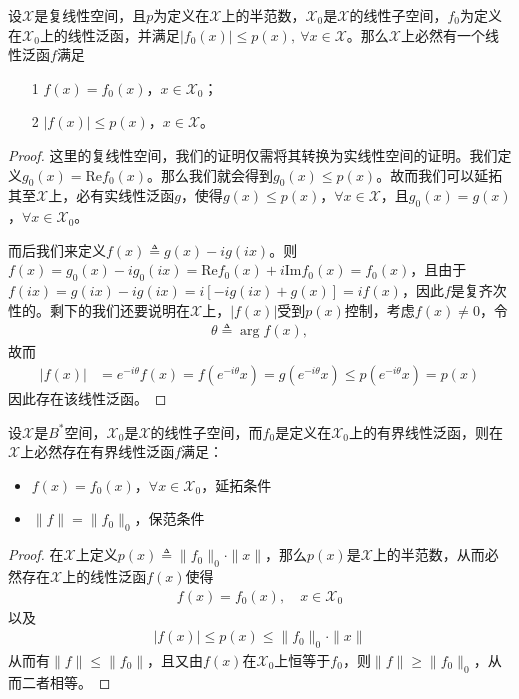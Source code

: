 \begin{theorem}
    设$\mathscr{X}$是复线性空间，且$p$为定义在$\mathscr{X}$上的半范数，$\mathscr{X}_0$是$\mathscr{X}$的线性子空间，$f_0$为定义在$\mathscr{X}_0$上的线性泛函，并满足$|f_0(x)| \leqslant p(x),\ \forall x\in\mathscr{X}$。那么$\mathscr{X}$上必然有一个线性泛函$f$满足
    \begin{itemize}
        \item[1] $f(x) = f_0(x)$，$x\in\mathscr{X}_0$；
        \item[2] $|f(x)| \leqslant p(x)$，$x\in\mathscr{X}$。
    \end{itemize}
\end{theorem}
\begin{proof}
    这里的复线性空间，我们的证明仅需将其转换为实线性空间的证明。我们定义$g_0(x) = \text{Re} f_0(x)$。那么我们就会得到$g_0(x)\leqslant p(x)$。故而我们可以延拓其至$\mathscr{X}$上，必有实线性泛函$g$，使得$g(x)\leqslant p(x)$，$\forall x\in\mathscr{X}$，且$g_0(x) = g(x)$，$\forall x\in \mathscr{X}_0$。

    而后我们来定义$f(x)\triangleq g(x) - ig(ix)$。则$f(x) = g_0(x) - ig_0(ix) = \text{Re}f_0(x) + i\text{Im}f_0(x) = f_0(x)$，且由于$f(ix) = g(ix) - ig(ix) = i[-ig(ix) + g(x)] = if(x)$，因此$f$是复齐次性的。剩下的我们还要说明在$\mathscr{X}$上，$|f(x)|$受到$p(x)$控制，考虑$f(x)\neq 0$，令
    \begin{align*}
        \theta \triangleq \arg f(x),
    \end{align*}
    故而
    \begin{align*}
        |f(x)| &= e^{-i\theta} f(x) = f(e^{-i\theta}x) = g(e^{-i\theta}x) \leqslant p(e^{-i\theta} x) = p(x)
    \end{align*}
    因此存在该线性泛函。
\end{proof}


\begin{theorem}
    设$\mathscr{X}$是$B^*$空间，$\mathscr{X}_0$是$\mathscr{X}$的线性子空间，而$f_0$是定义在$\mathscr{X}_0$上的有界线性泛函，则在$\mathscr{X}$上必然存在有界线性泛函$f$满足：
    \begin{itemize}
        \item $f(x) = f_0(x)$，$\forall x\in\mathscr{X}_0$，延拓条件
        \item $\|f\| = \|f_0\|_0$，保范条件
    \end{itemize}
\end{theorem}
\begin{proof}
    在$\mathscr{X}$上定义$p(x)\triangleq \|f_0\|_0 \cdot\|x\|$，那么$p(x)$是$\mathscr{X}$上的半范数，从而必然存在$\mathscr{X}$上的线性泛函$f(x)$使得
    \begin{align*}
        f(x) = f_0(x),\quad x\in\mathscr{X}_0
    \end{align*}
    以及
    \begin{align*}
        |f(x)|\leqslant p(x) \leqslant \|f_0\|_0 \cdot\|x\| 
    \end{align*}
    从而有$\|f\|\leqslant \|f_0\|$，且又由$f(x)$在$\mathscr{X}_0$上恒等于$f_0$，则$\|f\|\geqslant \|f_0\|_0$，从而二者相等。
\end{proof}


